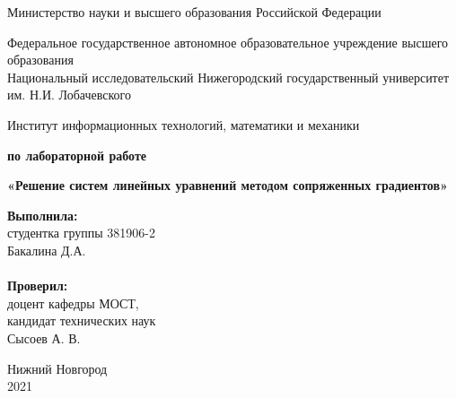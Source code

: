 \documentclass{report}
\begin{document}
\begin{titlepage}

\begin{center}
Министерство науки и высшего образования Российской Федерации
\end{center}

\begin{center}
Федеральное государственное автономное образовательное учреждение высшего образования \\
Национальный исследовательский Нижегородский государственный университет им. Н.И. Лобачевского
\end{center}

\begin{center}
Институт информационных технологий, математики и механики
\end{center}

\vspace{4em}

\begin{center}
\textbf{ по лабораторной работе} \\
\end{center}
\begin{center}
\textbf{\Large«Решение систем линейных уравнений методом сопряженных градиентов»} \\
\end{center}

\vspace{4em}

\newbox{\lbox}
\newlength{\maxl}
\setlength{\maxl}{\wd\lbox}
\hfill\parbox{7cm}{
\hspace*{5cm}\hspace*{-5cm}\textbf{Выполнила:} \\ студентка группы 381906-2 \\ Бакалина Д.А.\\
\\
\hspace*{5cm}\hspace*{-5cm}\textbf{Проверил:}\\ доцент кафедры МОСТ, \\ кандидат технических наук \\ Сысоев А. В.\\
}
\vspace{\fill}

\begin{center} Нижний Новгород \\ 2021 \end{center}

\end{titlepage}
\end{document}
